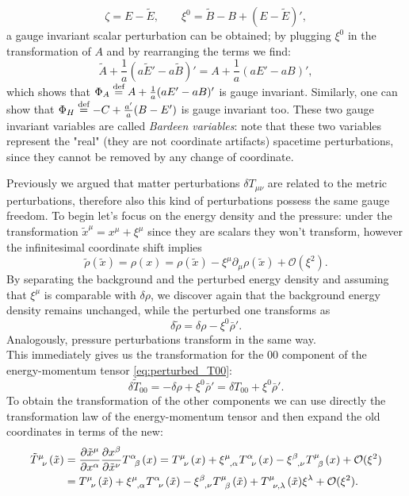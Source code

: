$$ \zeta=  E-\tilde E,\qquad \xi^0=\tilde B-B +( E-\tilde E)',$$
a gauge invariant scalar perturbation can be obtained; by plugging $\xi^0$ in the transformation of $A$ and by rearranging the terms we find:
$$\tilde A+\frac{1}{a}(a\tilde E'-a\tilde B)'= A+\frac{1}{a}(a E'-a B)',$$ 
which shows that $\Phi_A\stackrel{\text{def}}{=} A+\frac{1}{a}(a E'-a B)'$ is gauge invariant. Similarly, one can show that $\Phi_H\stackrel{\text{def}}{=} -C+\frac{a'}{a}(B-E')$ is gauge invariant too. These two gauge invariant variables are called \emph{Bardeen variables}: note that these two variables represent the "real" (they are not coordinate artifacts) spacetime perturbations, since they cannot be removed by any change of coordinate.

Previously we argued that matter perturbations $\delta T_{\mu\nu}$ are related to the metric perturbations, therefore also this kind of perturbations possess the same gauge freedom.
To begin let's focus on the energy density and the pressure: under the transformation $\tilde x^\mu= x^\mu+\xi^\mu$ since they are scalars they won't transform, however the infinitesimal coordinate shift implies
$$\tilde\rho(\tilde x)=\rho(x)= \rho(\tilde x)-\xi^\mu\partial_\mu\rho(\tilde x)+\mathcal{O}(\xi^2).$$
By separating the background and the perturbed energy density and assuming that $\xi^\mu$ is comparable with $\delta\rho$, we discover again that the background energy density remains unchanged, while the perturbed one transforms as
$$ \delta\tilde\rho=\delta\rho-\xi^0\bar\rho'.$$
Analogously, pressure perturbations transform in the same way.\\
This immediately gives us the transformation for the $00$ component of the energy-momentum tensor \eqref{eq:perturbed_T00}:   
$$\delta \tilde T_{00}=-\delta\rho+\xi^0\bar\rho'=\delta T_{00}+\xi^0\bar\rho'.$$
To obtain the transformation of the other components we can use directly the transformation law of the energy-momentum tensor and then expand the old coordinates in terms of the new:
\begin{align*}
    \tensor{\tilde T}{^\mu_\nu}(\tilde x)&=\frac{\partial \tilde x^\mu}{\partial  x^\alpha}\frac{\partial x^\beta}{\partial  \tilde x^\nu}\tensor{T}{^\alpha_\beta}(x)=\tensor{T}{^\mu_\nu}(x)+\tensor{\xi}{^\mu_{,\alpha}}\tensor{T}{^\alpha_\nu}(x)-\tensor{\xi}{^\beta_{,\nu}}\tensor{T}{^\mu_\beta}(x)+\mathcal{O}(\xi^2)\\
    &=\tensor{T}{^\mu_\nu}(\tilde x)+\tensor{\xi}{^\mu_{,\alpha}}\tensor{T}{^\alpha_\nu}(\tilde x)-\tensor{\xi}{^\beta_{,\nu}}\tensor{T}{^\mu_\beta}(\tilde x)+\tensor{T}{^{\mu}_{\nu,\lambda}}(\tilde x)\xi^\lambda +\mathcal{O}(\xi^2).
\end{align*} 
